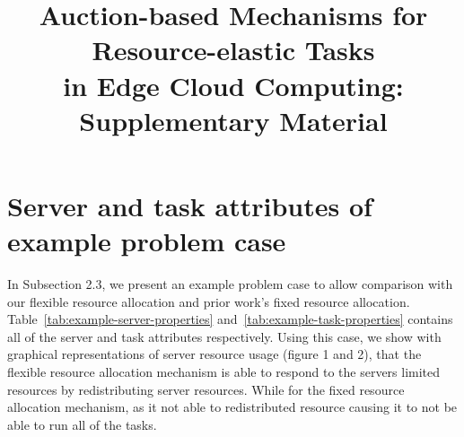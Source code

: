 \documentclass[sigconf]{aamas}
\title[AAMAS-2021 Formatting Instructions]{Auction-based Mechanisms for Resource-elastic Tasks\\in Edge Cloud Computing: Supplementary Material}
\begin{document}
\maketitle

\section{Server and task attributes of example problem case}
\label{sec:example-problem-case}
In Subsection 2.3, we present an example problem case to allow comparison with our flexible resource allocation and prior work's fixed resource allocation. Table~\ref{tab:example-server-properties} and~\ref{tab:example-task-properties} contains all of the server and task attributes respectively. Using this case, we show with graphical representations of server resource usage (figure 1 and 2), that the flexible resource allocation mechanism is able to respond to the servers limited resources by redistributing server resources. While for the fixed resource allocation mechanism, as it not able to redistributed resource causing it to not be able to run all of the tasks.
\end{document}
